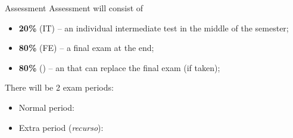 \documentclass[aspectratio=169]{beamer}
\begin{document}
\begin{frame}{Assessment}
  Assessment will consist of
  \begin{itemize}
  \item \textbf{20\%} (IT) -- an individual \alert{intermediate test} in the middle of the semester;
  \item \textbf{80\%} (\alert{FE}) -- a \alert{final exam} at the end;
  \item \textbf{80\%} () -- an  that can replace the final exam (if taken);
  \end{itemize}

  There will be 2 exam periods:
  \begin{itemize}
    \item Normal period:
    \item Extra period (\emph{recurso}): 
  \end{itemize}
\end{frame}
\end{document}
